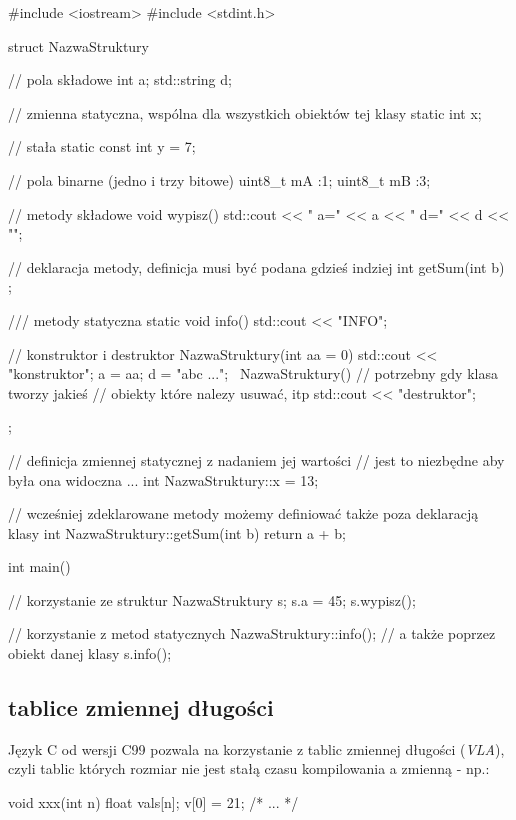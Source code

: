 \begin{CodeFrame*}[cpp]{}
#include <iostream>
#include <stdint.h>

struct NazwaStruktury {
    // pola składowe
    int a;
    std::string d;
    
    // zmienna statyczna, wspólna dla wszystkich obiektów tej klasy
    static int x;
    
    // stała
    static const int y = 7;
    
    // pola binarne (jedno i trzy bitowe)
    uint8_t mA :1;
    uint8_t mB :3;
    
    // metody składowe
    void wypisz() {
        std::cout << " a=" << a << " d=" << d << "\n";
    }
    
    // deklaracja metody, definicja musi być podana gdzieś indziej
    int getSum(int b) ;
    
    /// metody statyczna
    static void info() {
        std::cout << "INFO\n";
    }
    
    // konstruktor i destruktor
    NazwaStruktury(int aa = 0) {
        std::cout << "konstruktor\n";
        a = aa;
        d = "abc ...";
    }
    ~NazwaStruktury() {
        // potrzebny gdy klasa tworzy jakieś
        // obiekty które nalezy usuwać, itp
        std::cout << "destruktor\n";
    }
};

// definicja zmiennej statycznej z nadaniem jej wartości
// jest to niezbędne aby była ona widoczna ...
int NazwaStruktury::x = 13;

// wcześniej zdeklarowane metody możemy definiować także poza deklaracją klasy
int NazwaStruktury::getSum(int b) {
    return a + b;
}

int main() {
    // korzystanie ze struktur
    NazwaStruktury s;
    s.a = 45;
    s.wypisz();

    // korzystanie z metod statycznych
    NazwaStruktury::info();
    // a także poprzez obiekt danej klasy
    s.info();
}
\end{CodeFrame*}

\subsection{tablice zmiennej długości}

Język C od wersji C99 pozwala na korzystanie z tablic zmiennej długości (\textit{VLA}), czyli tablic których rozmiar nie jest stałą czasu kompilowania a zmienną - np.:

\begin{CodeFrame*}[c]{}
void xxx(int n) {
    float vals[n];
    v[0] = 21;
    /* ... */
}
\end{CodeFrame*}

